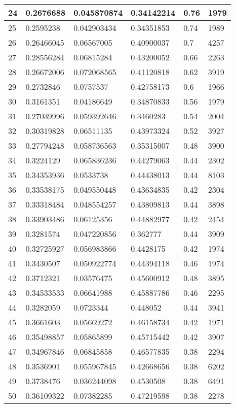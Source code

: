 \begin{longtable}{|l|l|l|l|l|l|}
24 & 0.2676688 & 0.045870874 & 0.34142214 & 0.76 & 1979 \\ \hline 
25 & 0.2595238 & 0.042903434 & 0.34351853 & 0.74 & 1989 \\ \hline 
26 & 0.26466045 & 0.06567005 & 0.40900037 & 0.7 & 4257 \\ \hline 
27 & 0.28556284 & 0.06815284 & 0.43200052 & 0.66 & 2263 \\ \hline 
28 & 0.26672006 & 0.072068565 & 0.41120818 & 0.62 & 3919 \\ \hline 
29 & 0.2732846 & 0.0757537 & 0.42758173 & 0.6 & 1966 \\ \hline 
30 & 0.3161351 & 0.04186649 & 0.34870833 & 0.56 & 1979 \\ \hline 
31 & 0.27039996 & 0.059392646 & 0.3460283 & 0.54 & 2004 \\ \hline 
32 & 0.30319828 & 0.06511135 & 0.43973324 & 0.52 & 3927 \\ \hline 
33 & 0.27794248 & 0.058736563 & 0.35315007 & 0.48 & 3900 \\ \hline 
34 & 0.3224129 & 0.065836236 & 0.44279063 & 0.44 & 2302 \\ \hline 
35 & 0.34353936 & 0.0533738 & 0.44438013 & 0.44 & 8103 \\ \hline 
36 & 0.33538175 & 0.049550448 & 0.43634835 & 0.42 & 2304 \\ \hline 
37 & 0.33318484 & 0.048554257 & 0.43809813 & 0.44 & 3898 \\ \hline 
38 & 0.33903486 & 0.06125356 & 0.44882977 & 0.42 & 2454 \\ \hline 
39 & 0.3281574 & 0.047220856 & 0.362777 & 0.44 & 3909 \\ \hline 
40 & 0.32725927 & 0.056983866 & 0.4428175 & 0.42 & 1974 \\ \hline 
41 & 0.3430507 & 0.050922774 & 0.44394118 & 0.46 & 1974 \\ \hline 
42 & 0.3712321 & 0.03576475 & 0.45600912 & 0.48 & 3895 \\ \hline 
43 & 0.34533533 & 0.06641988 & 0.45887786 & 0.46 & 2295 \\ \hline 
44 & 0.3282059 & 0.0723344 & 0.448052 & 0.44 & 3941 \\ \hline 
45 & 0.3661603 & 0.05669272 & 0.46158734 & 0.42 & 1971 \\ \hline 
46 & 0.35498857 & 0.05865899 & 0.45715442 & 0.42 & 3907 \\ \hline 
47 & 0.34967846 & 0.06845858 & 0.46577835 & 0.38 & 2294 \\ \hline 
48 & 0.3536901 & 0.055967845 & 0.42668656 & 0.38 & 6202 \\ \hline 
49 & 0.3738476 & 0.036244098 & 0.4530508 & 0.38 & 6491 \\ \hline 
50 & 0.36109322 & 0.07382285 & 0.47219598 & 0.38 & 2278 \\ \hline 
\end{longtable}